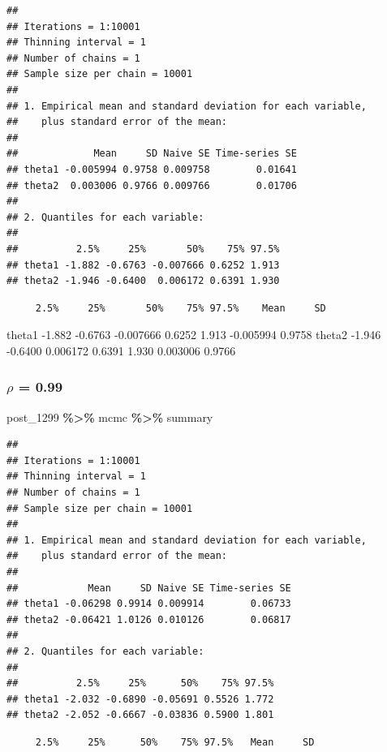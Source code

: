 \documentclass[
]{article}
\newenvironment{Shaded}{\begin{snugshade}}{\end{snugshade}}
\newcommand{\NormalTok}[1]{#1}
\newcommand{\SpecialCharTok}[1]{\textcolor[rgb]{0.81,0.36,0.00}{\textbf{#1}}}
\begin{document}
\begin{verbatim}
## 
## Iterations = 1:10001
## Thinning interval = 1 
## Number of chains = 1 
## Sample size per chain = 10001 
## 
## 1. Empirical mean and standard deviation for each variable,
##    plus standard error of the mean:
## 
##             Mean     SD Naive SE Time-series SE
## theta1 -0.005994 0.9758 0.009758        0.01641
## theta2  0.003006 0.9766 0.009766        0.01706
## 
## 2. Quantiles for each variable:
## 
##          2.5%     25%       50%    75% 97.5%
## theta1 -1.882 -0.6763 -0.007666 0.6252 1.913
## theta2 -1.946 -0.6400  0.006172 0.6391 1.930
\end{verbatim}

\begin{verbatim}
     2.5%     25%       50%    75% 97.5%    Mean     SD
\end{verbatim}

theta1 -1.882 -0.6763 -0.007666 0.6252 1.913 -0.005994 0.9758 theta2
-1.946 -0.6400 0.006172 0.6391 1.930 0.003006 0.9766

\subsubsection{\texorpdfstring{\(\rho\) =
0.99}{\textbackslash rho = 0.99}}\label{rho-0.99}

\begin{Shaded}
\begin{Highlighting}[]
\NormalTok{post\_1299 }\SpecialCharTok{\%\textgreater{}\%}\NormalTok{ mcmc }\SpecialCharTok{\%\textgreater{}\%}\NormalTok{ summary}
\end{Highlighting}
\end{Shaded}

\begin{verbatim}
## 
## Iterations = 1:10001
## Thinning interval = 1 
## Number of chains = 1 
## Sample size per chain = 10001 
## 
## 1. Empirical mean and standard deviation for each variable,
##    plus standard error of the mean:
## 
##            Mean     SD Naive SE Time-series SE
## theta1 -0.06298 0.9914 0.009914        0.06733
## theta2 -0.06421 1.0126 0.010126        0.06817
## 
## 2. Quantiles for each variable:
## 
##          2.5%     25%      50%    75% 97.5%
## theta1 -2.032 -0.6890 -0.05691 0.5526 1.772
## theta2 -2.052 -0.6667 -0.03836 0.5900 1.801
\end{verbatim}

\begin{verbatim}
     2.5%     25%      50%    75% 97.5%   Mean     SD
\end{verbatim}
\end{document}
